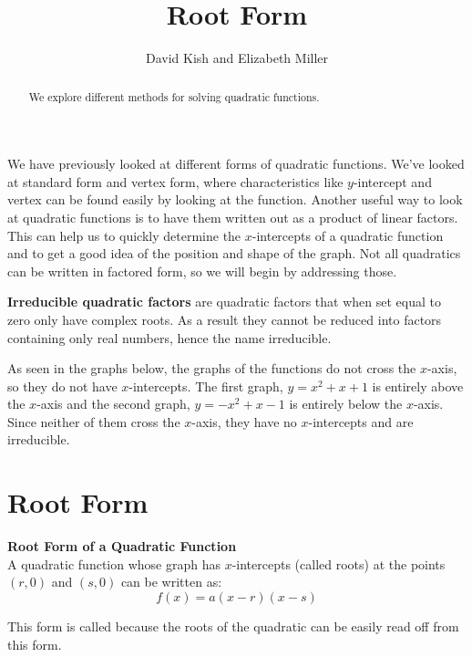 \documentclass{ximera}
\author{David Kish and Elizabeth Miller}
\title{Root Form}
\begin{document}
\begin{abstract}
We explore different methods for solving quadratic functions.
\end{abstract}
\maketitle
We have previously looked at different forms of quadratic functions. We've looked at standard form and vertex form, where characteristics like $y$-intercept and vertex can be found easily by looking at the function. Another useful way to look at quadratic functions is to have them written out as a product of linear factors. This can help us to quickly determine the $x$-intercepts of a quadratic function and to get a good idea of the position and shape of the graph. Not all quadratics can be written in factored form, so we will begin by addressing those.
\begin{remark}
\textbf{Irreducible quadratic factors} are quadratic factors that when set equal to zero only have complex roots.  As a result they cannot be reduced into factors containing only real numbers, hence the name irreducible. 
\end{remark}
As seen in the graphs below, the graphs of the functions do not cross the $x$-axis, so they do not have $x$-intercepts. The first graph, $y=x^2+x+1$ is entirely above the $x$-axis and the second graph, $y=-x^2+x-1$ is entirely below the $x$-axis. Since neither of them cross the $x$-axis, they have no $x$-intercepts and are irreducible.

\section{Root Form}
\begin{callout} \textbf{\large{Root Form of a Quadratic Function}}\\
          A quadratic function whose graph has $x$-intercepts (called roots) at the points $(r,0)$ and $(s,0)$ can be written as:\\
\[
f(x)=a(x-r)(x-s)
\]

\end{callout}

This form is called  because the roots of the quadratic can be easily read off from this form.
\end{document}

